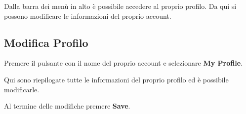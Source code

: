 Dalla barra dei menù in alto è possibile accedere al proprio profilo.
Da qui si possono modificare le informazioni del proprio account.

\subsection{Modifica Profilo}

Premere il pulsante con il nome del proprio account e selezionare \textbf{My Profile}.


\noindent Qui sono riepilogate tutte le informazioni del proprio profilo ed è possibile modificarle.

\noindent Al termine delle modifiche premere \textbf{Save}.